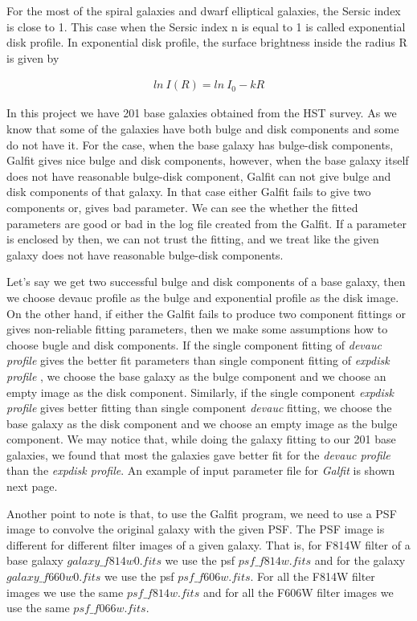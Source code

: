 For the most of the spiral galaxies and dwarf elliptical galaxies, the Sersic index
is close to 1. This case when the Sersic index n is equal to 1 is called
exponential disk profile.
In exponential disk profile, the surface brightness inside the radius R is given
by

\begin{eqnarray}\label{[eq:expdisk]}
    ln \ I(R) = ln \ I_0 - k R
\end{eqnarray}

In this project we have 201 base galaxies obtained from the HST survey. As we 
know that some of the galaxies have both bulge and disk components and some
do not have it. For the case, when the base galaxy has bulge-disk components,
Galfit gives nice bulge and disk components, however, when the base galaxy itself
does not have reasonable bulge-disk component, Galfit can not give bulge and disk
components of that galaxy. In that case either Galfit fails to give two 
components or, gives bad parameter. We can see the whether the fitted parameters
are good or bad in the log file created from the Galfit. If a parameter is 
enclosed by \* then, we can not trust the fitting, and we treat like the given
galaxy does not have reasonable bulge-disk components.

Let's say we get two successful bulge and disk components of
a base galaxy, then we choose devauc profile as the bulge and exponential profile
as the disk image. On the other hand, if either the Galfit fails to produce
two component fittings or gives non-reliable fitting parameters, then we make some 
assumptions how to choose bugle and disk components. 
If the single component fitting of \textit{devauc profile} gives the better fit 
parameters than single component fitting of \textit{expdisk profile} ,
we choose the base galaxy as the bulge component and we
choose an empty image as the disk component. 
Similarly, if the single component \textit{expdisk profile} gives better fitting than 
single component \textit{devauc} fitting, we choose the base galaxy as the disk component 
and we choose an empty image as the bulge component. We may notice that,
while doing the galaxy fitting to our 201 base galaxies, we found that most the galaxies
gave better fit for the \textit{devauc profile} than the \textit{expdisk profile}.
An example of input parameter file for \textit{Galfit} is shown next page.
\newpage




Another point to note is that, to use the Galfit program, we need to use a PSF image
to convolve the original galaxy with the given PSF. The PSF image is different for 
different filter images of a given galaxy. That is, for F814W filter of a base
galaxy $galaxy\_f814w0.fits$ we use the psf $psf\_f814w.fits$ and for the galaxy
$galaxy\_f660w0.fits$ we use the psf $psf\_f606w.fits$. For all the F814W filter
images we use the same $psf\_f814w.fits$ and for all the F606W filter images we use
the same $psf\_f066w.fits$.

